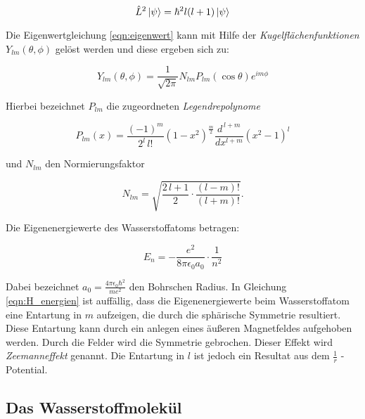 \begin{equation}
    \hat{L}^2 \ket{\psi} = \hbar^2 l(l+1) \ket{\psi}
    \label{eqn:L}
\end{equation}

Die Eigenwertgleichung \eqref{eqn:eigenwert} kann mit Hilfe der \textit{Kugelflächenfunktionen} $Y_{lm} (\theta, \phi)$ gelöst werden und diese ergeben sich zu:

\begin{equation}
    Y_{lm} (\theta, \phi) = \frac{1}{\sqrt{2 \pi}} N_{lm} P_{lm} (\cos \theta) e^{im\phi}
    \label{eqn:kugelflaechen}
\end{equation}

Hierbei bezeichnet $P_{lm}$ die zugeordneten \textit{Legendrepolynome}

\begin{equation}
    P_{lm} (x) = \frac{(-1)^m}{2^l \, l!} \left( 1-x^2 \right)^{\! \frac{m}{2}} \frac{d^{\, l+m}}{dx^{l+m}} \left( x^2 - 1 \right)^l
    \label{eqn:legendre}
\end{equation}

und $N_{lm}$ den Normierungsfaktor

\begin{equation}
    N_{lm} = \sqrt{\frac{2 \, l +1}{2} \cdot \frac{(l-m)!}{(l+m)!}} .
    \label{eqn:normierung}
\end{equation}

Die Eigenenergiewerte des Wasserstoffatoms betragen:

\begin{equation}
    E_n = - \frac{e^2}{8 \pi \epsilon_0 a_0} \cdot \frac{1}{n^2}
    \label{eqn:H_energien}
\end{equation}

Dabei bezeichnet $a_0 = \frac{4 \pi \epsilon_0 \hbar^2}{m e^2}$ den Bohrschen Radius. In Gleichung \eqref{eqn:H_energien} ist auffällig, dass die Eigenenergiewerte beim Wasserstoffatom eine Entartung in $m$ aufzeigen, die durch die sphärische Symmetrie resultiert. Diese Entartung kann durch ein anlegen eines äußeren Magnetfeldes aufgehoben werden. Durch die Felder wird die Symmetrie gebrochen. Dieser Effekt wird \textit{Zeemanneffekt} genannt. Die Entartung in $l$ ist jedoch ein Resultat aus dem $\frac{1}{r}$ - Potential.

\subsection{Das Wasserstoffmolekül}
\label{sec:H2}



